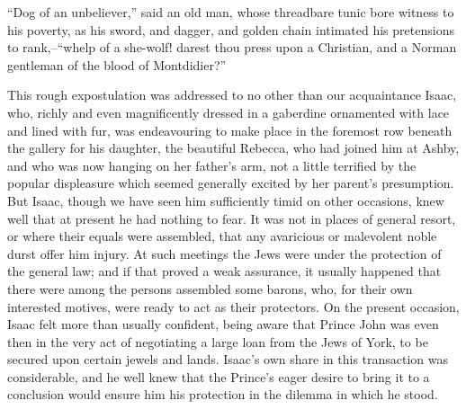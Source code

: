 ``Dog of an unbeliever,'' said an old man, whose threadbare tunic bore
witness to his poverty, as his sword, and dagger, and golden chain
intimated his pretensions to rank,--``whelp of a she-wolf! darest thou
press upon a Christian, and a Norman gentleman of the blood of
Montdidier?''

This rough expostulation was addressed to no other than our acquaintance
Isaac, who, richly and even magnificently dressed in a gaberdine
ornamented with lace and lined with fur, was endeavouring to make place
in the foremost row beneath the gallery for his daughter, the beautiful
Rebecca, who had joined him at Ashby, and who was now hanging on her
father's arm, not a little terrified by the popular displeasure which
seemed generally excited by her parent's presumption. But Isaac, though
we have seen him sufficiently timid on other occasions, knew well that
at present he had nothing to fear. It was not in places of general
resort, or where their equals were assembled, that any avaricious or
malevolent noble durst offer him injury. At such meetings the Jews were
under the protection of the general law; and if that proved a weak
assurance, it usually happened that there were among the persons
assembled some barons, who, for their own interested motives, were ready
to act as their protectors. On the present occasion, Isaac felt more
than usually confident, being aware that Prince John was even then in
the very act of negotiating a large loan from the Jews of York, to be
secured upon certain jewels and lands. Isaac's own share in this
transaction was considerable, and he well knew that the Prince's eager
desire to bring it to a conclusion would ensure him his protection in
the dilemma in which he stood.

